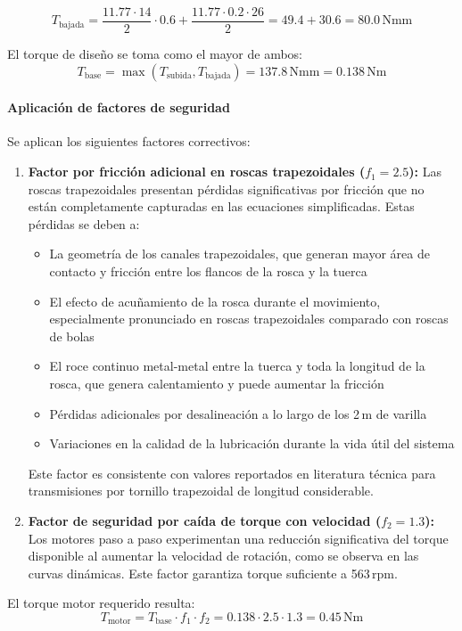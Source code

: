 \[T_{\text{bajada}} = \frac{11.77 \cdot 14}{2} \cdot 0.6 + \frac{11.77 \cdot 0.2 \cdot 26}{2} = 49.4 + 30.6 = 80.0\,\text{Nmm}\]

El torque de diseño se toma como el mayor de ambos:
\[T_{\text{base}} = \max(T_{\text{subida}}, T_{\text{bajada}}) = 137.8\,\text{Nmm} = 0.138\,\text{Nm}\]

\paragraph{Aplicación de factores de seguridad}
Se aplican los siguientes factores correctivos:

\begin{enumerate}
    \item \textbf{Factor por fricción adicional en roscas trapezoidales ($f_1 = 2.5$):} Las roscas trapezoidales presentan pérdidas significativas por fricción que no están completamente capturadas en las ecuaciones simplificadas. Estas pérdidas se deben a:
    \begin{itemize}
        \item La geometría de los canales trapezoidales, que generan mayor área de contacto y fricción entre los flancos de la rosca y la tuerca
        \item El efecto de acuñamiento de la rosca durante el movimiento, especialmente pronunciado en roscas trapezoidales comparado con roscas de bolas
        \item El roce continuo metal-metal entre la tuerca y toda la longitud de la rosca, que genera calentamiento y puede aumentar la fricción
        \item Pérdidas adicionales por desalineación a lo largo de los 2\,m de varilla
        \item Variaciones en la calidad de la lubricación durante la vida útil del sistema
    \end{itemize}
    Este factor es consistente con valores reportados en literatura técnica para transmisiones por tornillo trapezoidal de longitud considerable.
    
    \item \textbf{Factor de seguridad por caída de torque con velocidad ($f_2 = 1.3$):} Los motores paso a paso experimentan una reducción significativa del torque disponible al aumentar la velocidad de rotación, como se observa en las curvas dinámicas. Este factor garantiza torque suficiente a 563\,rpm.
\end{enumerate}

El torque motor requerido resulta:
\begin{equation}
T_{\text{motor}} = T_{\text{base}} \cdot f_1 \cdot f_2 = 0.138 \cdot 2.5 \cdot 1.3 = 0.45\,\text{Nm}
\label{eq:torque_motor_vertical}
\end{equation}


